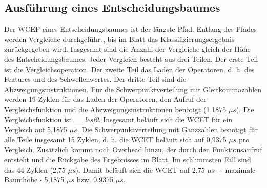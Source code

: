\subsection{Ausführung eines Entscheidungsbaumes}
Der WCEP eines Entscheidungsbaumes ist der längste Pfad. Entlang des Pfades werden Vergleiche durchgeführt, bis im Blatt das Klassifizierungsergebnis zurückgegeben wird. Insgesamt sind die Anzahl der Vergleiche gleich
der Höhe des Entscheidungsbaumes.
\newline
\newline
Jeder Vergleich besteht aus drei Teilen. Der erste Teil ist die Vergleichsoperation. Der zweite Teil das Laden der Operatoren, d. h. des Features und des Schwellenwertes. Der dritte Teil sind die Abzweigungsinstruktionen. Für
die Schwerpunktverteilung mit Gleitkommazahlen werden 19 Zyklen für das Laden der Operatoren, den Aufruf der Vergleichsfunktion und die Abzweigungsinstruktionen benötigt (1,1875 $\mu s$). Die Vergleichsfunktion ist
\textit{\_\_lesf2}. Insgesamt beläuft sich die WCET für ein Vergleich auf 5,1875 $\mu s$. Die Schwerpunktverteilung mit Ganzzahlen benötigt für alle Teile insgesamt 15 Zyklen, d. h. die WCET beläuft sich
auf 0,9375 $\mu s$ pro Vergleich.
\newline
\newline
Zusätzlich kommt noch Overhead hinzu, der durch den Funktionsaufruf entsteht und die Rückgabe des Ergebnisses im Blatt. Im schlimmsten Fall sind das 44 Zyklen (2,75 $\mu s$). Damit beläuft sich die WCET auf
2,75 $\mu s$ + maximale Baumhöhe $\cdot$ 5,1875 $\mu s$ bzw. 0,9375 $\mu s$.